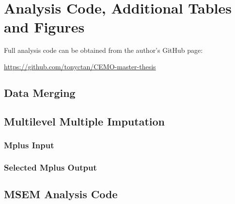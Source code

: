 \section{Analysis Code, Additional Tables and Figures}

Full analysis code can be obtained from the author's GitHub page:

\href{https://github.com/tonyctan/CEMO-master-thesis}{https://github.com/tonyctan/CEMO-master-thesis}

\subsection{Data Merging}\label{R.reimport}

\begin{MAEcode}
    
\end{MAEcode}





\subsection{Multilevel Multiple Imputation}

\subsubsection{Mplus Input}\label{sec:MMI}

\begin{MAEcode}
    
\end{MAEcode}

\subsubsection{Selected Mplus Output}

\begin{MAEcode}
    
\end{MAEcode}





\subsection{MSEM Analysis Code}

